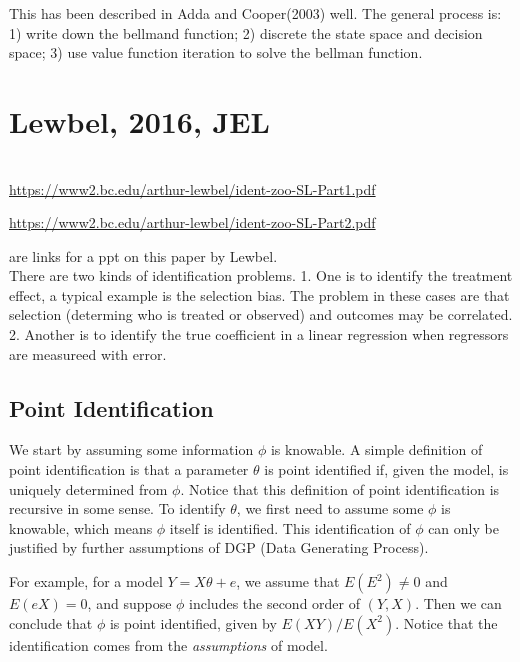 \documentclass{book}
\theoremstyle{plain}
\theoremstyle{definition}
\begin{document}
This has been described in Adda and Cooper(2003) well. 
The general process is: 
1) write down the bellmand function;
2) discrete the state space and decision space;
3) use value function iteration to solve the bellman function.




\section{Lewbel, 2016, JEL} %
\label{sec:lewbel_2016_jel}

\textbf{}\\

\url{https://www2.bc.edu/arthur-lewbel/ident-zoo-SL-Part1.pdf} 

\url{https://www2.bc.edu/arthur-lewbel/ident-zoo-SL-Part2.pdf}

are links for a ppt on this paper by Lewbel.\\

There are two kinds of identification problems. 
1. One is to identify the treatment effect, a typical example is the selection bias. The problem in these cases are that selection (determing who is treated or observed) and outcomes may be correlated. 
2. Another is to identify the true coefficient in a linear regression when regressors are measureed with error.

\subsection{Point Identification} %
\label{sub:point_identification}

We start by assuming some information $\phi$ is knowable. A simple definition of point identification is that a parameter $\theta$ is point identified if, given the model, is uniquely determined from $\phi$. Notice that this definition of point identification is recursive in some sense. To identify $\theta$, we first need to assume some $\phi$ is knowable, which means $\phi$ itself is identified. This identification of $\phi$ can only be justified by further assumptions of DGP (Data Generating Process).

For example, for a model $Y = X\theta +e$, we assume that $E(E^2)\ne0$ and $E(eX)=0$, and suppose $\phi$ includes the second order of $(Y,X)$. Then we can conclude that $\phi$ is point identified, given by $E(XY)/E(X^2)$. Notice that the identification comes from the \textit{assumptions} of model.
\end{document}
